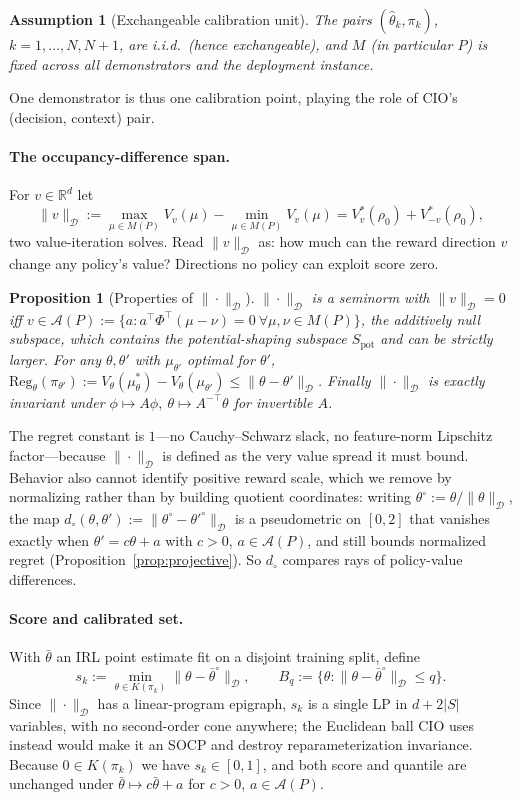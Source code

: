 \documentclass{article}
\newtheorem{proposition}{Proposition}
\newtheorem{assumption}{Assumption}
\newcommand{\Dnorm}[1]{\|#1\|_{\mathcal D}}
\begin{document}
\begin{assumption}[Exchangeable calibration unit]
\label{ass:unit}
The pairs $(\hat\theta_k,\pi_k)$, $k=1,\dots,N,N{+}1$, are i.i.d.\ (hence
exchangeable), and $M$ (in particular $P$) is fixed across all demonstrators and
the deployment instance.
\end{assumption}

One demonstrator is thus one calibration point, playing the role of CIO's
(decision, context) pair.

\paragraph{The occupancy-difference span.} For $v\in\mathbb R^d$ let
\[
\Dnorm{v}:=\max_{\mu\in M(P)}V_v(\mu)-\min_{\mu\in M(P)}V_v(\mu)
= V^*_v(\rho_0)+V^*_{-v}(\rho_0),
\]
two value-iteration solves. Read $\Dnorm{v}$ as: how much can the reward
direction $v$ change any policy's value? Directions no policy can exploit score
zero.

\begin{proposition}[Properties of $\Dnorm{\cdot}$]
\label{prop:da-seminorm}
$\Dnorm{\cdot}$ is a seminorm with $\Dnorm{v}=0$ iff $v\in\mathcal A(P):=\{a:
a^\top\Phi^\top(\mu-\nu)=0\ \forall\mu,\nu\in M(P)\}$, the \emph{additively
null} subspace, which contains the potential-shaping subspace
$S_{\mathrm{pot}}$ and can be strictly larger. For any $\theta,\theta'$ with
$\mu_{\theta'}$ optimal for $\theta'$,
$\mathrm{Reg}_\theta(\pi_{\theta'}):=V_\theta(\mu^*_\theta)-V_\theta(\mu_{\theta'})
\le\Dnorm{\theta-\theta'}$. Finally $\Dnorm{\cdot}$ is exactly invariant under
$\phi\mapsto A\phi,\ \theta\mapsto A^{-\top}\theta$ for invertible $A$.
\end{proposition}

The regret constant is $1$---no Cauchy--Schwarz slack, no feature-norm Lipschitz
factor---because $\Dnorm{\cdot}$ is defined as the very value spread it must
bound. Behavior also cannot identify positive reward scale, which we remove by
normalizing rather than by building quotient coordinates: writing
$\theta^\circ:=\theta/\Dnorm{\theta}$, the map
$d_\circ(\theta,\theta'):=\Dnorm{\theta^\circ-\theta'^\circ}$ is a pseudometric
on $[0,2]$ that vanishes exactly when $\theta'=c\theta+a$ with $c>0$,
$a\in\mathcal A(P)$, and still bounds normalized regret
(Proposition~\ref{prop:projective}). So $d_\circ$ compares rays of policy-value
differences.

\paragraph{Score and calibrated set.} With $\bar\theta$ an IRL point estimate
fit on a disjoint training split, define
\[
s_k:=\min_{\theta\in K(\pi_k)}\Dnorm{\theta-\bar\theta^\circ},
\qquad B_q:=\{\theta:\Dnorm{\theta-\bar\theta^\circ}\le q\}.
\]
Since $\Dnorm{\cdot}$ has a linear-program epigraph, $s_k$ is a single LP in
$d+2|S|$ variables, with no second-order cone anywhere; the Euclidean ball CIO
uses instead would make it an SOCP and destroy reparameterization invariance.
Because $0\in K(\pi_k)$ we have $s_k\in[0,1]$, and both score and quantile are
unchanged under $\bar\theta\mapsto c\bar\theta+a$ for $c>0$,
$a\in\mathcal A(P)$.
\end{document}
